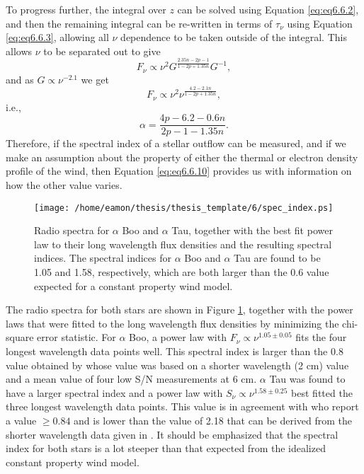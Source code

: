 To progress further, the integral over $z$ can be solved using Equation \ref{eq:eq6.6.2}, and then the remaining integral can be re-written in terms of $\tau _{\nu}$ using Equation \ref{eq:eq6.6.3}, allowing all $\nu$ dependence to be taken outside of the integral. This allows $\nu$ to be separated out to give
\begin{equation}
F_{\nu} \propto \nu^2 G^{\frac{2.35n -2p -1}{1-2p +1.35n}} G^{-1},
\label{eq:eq6.6.8}
\end{equation}
and as $G \propto \nu^{-2.1}$ we get
\begin{equation}
F_{\nu} \propto \nu^2 \nu^{\frac{4.2-2.1n}{1-2p +1.35n}},
\label{eq:eq6.6.9}
\end{equation}
i.e.,
\begin{equation}
\alpha = \frac{4p -6.2 -0.6n}{2p-1-1.35n}.
\label{eq:eq6.6.10}
\end{equation}
Therefore, if the spectral index of a stellar outflow can be measured, and if we make an assumption about the property of either the thermal or electron density profile of the wind, then Equation \ref{eq:eq6.6.10} provides us with information on how the other value varies.

\begin{figure}[t!]
\centering 
          \texttt{[image: /home/eamon/thesis/thesis\_template/6/spec\_index.ps]}
\caption[Power law fits to the spectra of $\alpha$ Boo and $\alpha$ Tau]{Radio spectra for $\alpha$ Boo and $\alpha$ Tau, together with the best fit power law to their long wavelength flux densities and the resulting spectral indices. The spectral indices for $\alpha$ Boo and $\alpha$ Tau are found to be 1.05 and 1.58, respectively, which are both larger than the 0.6 value expected for a constant property wind model.}
\label{fig6.6.1}
\end{figure}

The radio spectra for both stars are shown in Figure \ref{fig6.6.1}, together with the power laws that were fitted to the long wavelength flux densities by minimizing the chi-square error statistic. For $\alpha$ Boo, a power law with $F_{\nu} \propto \nu ^{1.05 \pm 0.05}$ fits the four longest wavelength data points well. This spectral index is larger than the 0.8 value obtained by \cite{drake_1986} whose value was based on a shorter wavelength (2 cm) value and a mean value of four low S/N measurements at 6 cm. $\alpha$ Tau was found to have a larger spectral index and a power law with $S_{\nu} \propto \nu ^{1.58 \pm 0.25}$ best fitted the three longest wavelength data points. This value is in agreement with \cite{drake_1986} who report a value $\ge 0.84$ and is lower than the value of 2.18 that can be derived from the shorter wavelength data given in \cite{wood_2007}. It should be emphasized that the spectral index for both stars is a lot steeper than that expected from the idealized constant property wind model. 


